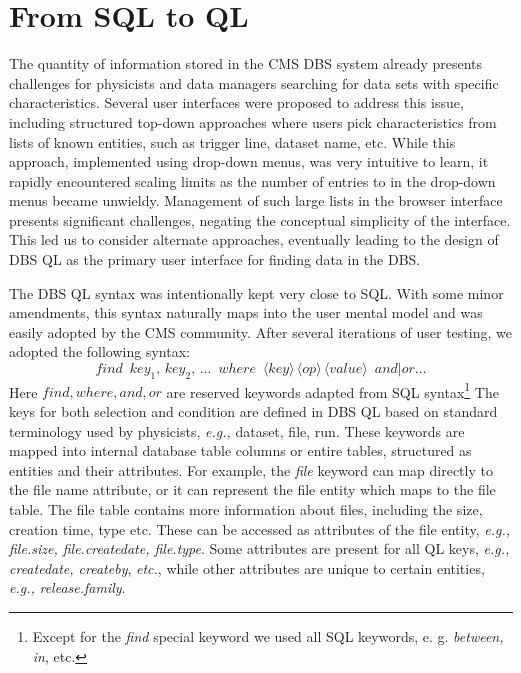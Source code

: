 \documentclass[a4paper]{jpconf}
\begin{document}
\section{From SQL to QL}

The quantity of information stored in the CMS DBS system already
presents challenges for physicists and data managers searching for
data sets with specific characteristics.
Several user interfaces were proposed to address this issue, including
structured top-down approaches where users pick characteristics
from lists of known entities, such as
trigger line, dataset name, etc.
While this approach, implemented using drop-down menus,
was very intuitive to learn,
it rapidly encountered scaling limits as the number of entries to in the drop-down menus
became unwieldy.
Management of such large lists in the browser interface presents significant challenges,
negating the conceptual simplicity of the interface. This led us to consider alternate
approaches, eventually leading to the design of
DBS QL as the primary user interface for finding data in the DBS.

The DBS QL syntax was intentionally kept very close to SQL.  With some minor amendments, this syntax naturally
maps into the user mental model and was easily adopted by the CMS
community. After several iterations of user testing, we adopted the following syntax:
\begin{equation}
find\,\,\,
key_1,\, key_2,\, ...\,\,\, where\,\,\,
\langle key\rangle\, 
\langle op\rangle\, 
\langle value\rangle \,\,\, and|or ...
\label{QL_syntax}
\end{equation}
Here $find, where, and, or$ are reserved keywords
adapted from SQL syntax\footnote{Except for the {\it find} special
keyword we used all SQL keywords, e. g. {\it between, in}, etc.}
The keys for both selection and condition are defined
in DBS QL based on standard terminology used by physicists, {\it e.g.,} dataset, file, run. 
These keywords are mapped into internal database table columns or entire tables,
structured as entities and their attributes. For example,
the {\it file} keyword can map directly to the file name attribute, or it can represent the file
entity which maps to the file table. The file table
contains more information about files, including the size, creation time,
type etc. These can be accessed as attributes of the file entity, {\it e.g.,}
{\it file.size, file.createdate, file.type}. Some attributes
are present for all QL keys, {\it e.g.,} {\it createdate, createby}, {\it etc.},
while other attributes are unique to certain entities, {\it e.g.,} {\it release.family}.
\end{document}
